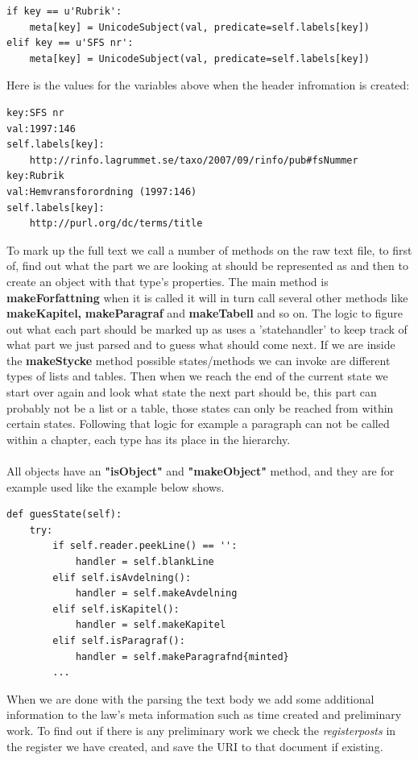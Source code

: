 \begin{verbatim}
if key == u'Rubrik':
	meta[key] = UnicodeSubject(val, predicate=self.labels[key])
elif key == u'SFS nr':
	meta[key] = UnicodeSubject(val, predicate=self.labels[key])
\end{verbatim} 
\linebreak
\newline
Here is the values for the variables above when the header infromation is created:\\
\begin{verbatim}
key:SFS nr
val:1997:146
self.labels[key]:
	http://rinfo.lagrummet.se/taxo/2007/09/rinfo/pub#fsNummer
key:Rubrik
val:Hemvransforordning (1997:146)
self.labels[key]:
	http://purl.org/dc/terms/title
\end{verbatim}
\linebreak
\newline
To mark up the full text we call a number of methods on the raw text file, to first of, find out what the part we are looking at should be represented as and then to create an object with that type's properties. The main method is \textbf{makeForfattning} when it is called it will in turn call several other methods like \textbf{makeKapitel,} \textbf{makeParagraf} and \textbf{makeTabell} and so on. The logic to figure out what each part should be marked up as uses a 'statehandler' to keep track of what part we just parsed and to guess what should come next. If we are inside the \textbf{makeStycke} method possible states/methods we can invoke are different types of lists and tables. Then when we reach the end of the current state we start over again and look what state the next part should be, this part can probably not be a list or a table, those states can only be reached from within certain states. Following that logic for example a paragraph can not be called within a chapter, each type has its place in the hierarchy. \\\\
All objects have an \textbf{"isObject"} and \textbf{"makeObject"} method, and they are for example used like the example below shows.\\ 
\begin{verbatim}
def guesState(self):
	try:
		if self.reader.peekLine() == '':
			handler = self.blankLine
		elif self.isAvdelning():
			handler = self.makeAvdelning
		elif self.isKapitel():
			handler = self.makeKapitel
		elif self.isParagraf():
			handler = self.makeParagrafnd{minted}
		...
\end{verbatim}
\linebreak  
\newline
When we are done with the parsing the text body we add some additional information to the law’s meta information such as time created and preliminary work. To find out if there is any preliminary work we check the \textit{registerposts} in the register we have created, and save the URI to that document if existing.

